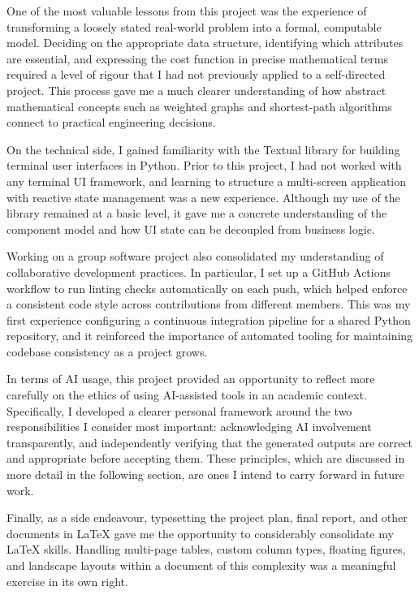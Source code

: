 \documentclass[a4paper,10pt]{amsart}
\begin{document}
One of the most valuable lessons from this project was the experience of transforming a loosely stated real-world problem into a formal, computable model.
Deciding on the appropriate data structure, identifying which attributes are essential, and expressing the cost function in precise mathematical terms required a level of rigour that I had not previously applied to a self-directed project.
This process gave me a much clearer understanding of how abstract mathematical concepts such as weighted graphs and shortest-path algorithms connect to practical engineering decisions.

On the technical side, I gained familiarity with the Textual library for building terminal user interfaces in Python.
Prior to this project, I had not worked with any terminal UI framework, and learning to structure a multi-screen application with reactive state management was a new experience.
Although my use of the library remained at a basic level, it gave me a concrete understanding of the component model and how UI state can be decoupled from business logic.

Working on a group software project also consolidated my understanding of collaborative development practices.
In particular, I set up a GitHub Actions workflow to run linting checks automatically on each push, which helped enforce a consistent code style across contributions from different members.
This was my first experience configuring a continuous integration pipeline for a shared Python repository, and it reinforced the importance of automated tooling for maintaining codebase consistency as a project grows.

In terms of AI usage, this project provided an opportunity to reflect more carefully on the ethics of using AI-assisted tools in an academic context.
Specifically, I developed a clearer personal framework around the two responsibilities I consider most important: acknowledging AI involvement transparently, and independently verifying that the generated outputs are correct and appropriate before accepting them.
These principles, which are discussed in more detail in the following section, are ones I intend to carry forward in future work.

Finally, as a side endeavour, typesetting the project plan, final report, and other documents in \LaTeX{} gave me the opportunity to considerably consolidate my \LaTeX{} skills.
Handling multi-page tables, custom column types, floating figures, and landscape layouts within a document of this complexity was a meaningful exercise in its own right.
\end{document}
